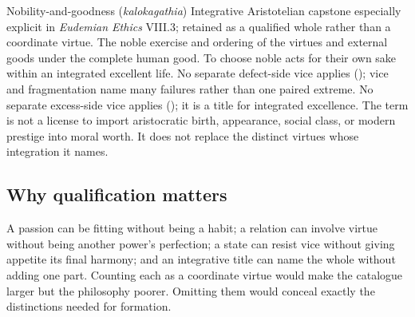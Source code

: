 \virtuedossier
  {Nobility-and-goodness (\emph{kalokagathia})}
  {Integrative Aristotelian capstone especially explicit in \emph{Eudemian Ethics} VIII.3; retained as a qualified whole rather than a coordinate virtue.}
  {The noble exercise and ordering of the virtues and external goods under the complete human good.}
  {To choose noble acts for their own sake within an integrated excellent life.}
  {No separate defect-side vice applies (); vice and fragmentation name many failures rather than one paired extreme.}
  {No separate excess-side vice applies (); it is a title for integrated excellence.}
  {The term is not a license to import aristocratic birth, appearance, social class, or modern prestige into moral worth. It does not replace the distinct virtues whose integration it names.}

\subsection{Why qualification matters}

A passion can be fitting without being a habit; a relation can involve virtue without being another power's perfection; a state can resist vice without giving appetite its final harmony; and an integrative title can name the whole without adding one part. Counting each as a coordinate virtue would make the catalogue larger but the philosophy poorer. Omitting them would conceal exactly the distinctions needed for formation.

